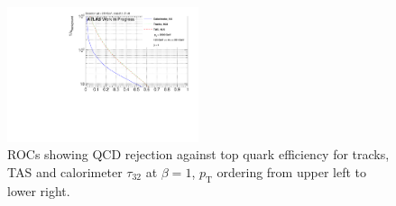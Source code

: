 \begin{figure}[htp]
\includegraphics[width=0.5\textwidth]{sascha_input/plots/Top/beta1/ROC_ALL_h_recoJet_nSub32_bin6.pdf}
\caption{{ROCs showing QCD rejection against top quark efficiency for tracks, TAS and calorimeter $\tau_{32}$ at $\beta=1$, $p_{\mathrm{T}}$ ordering from upper left to lower right.}}\label{fig:ROC_top}
\end{figure}



